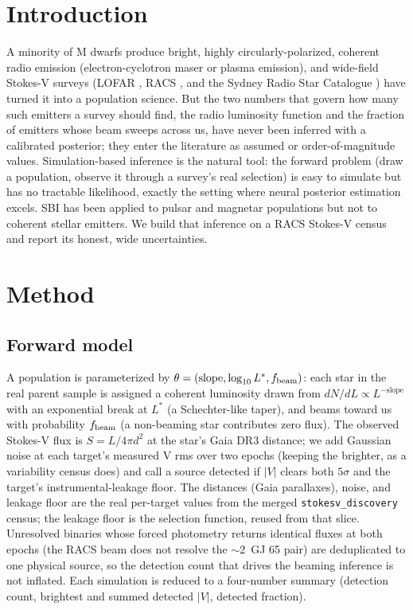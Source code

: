 \documentclass[twocolumn]{aastex631}
\newcommand{\code}[1]{\texttt{#1}}
\begin{document}

\section{Introduction}
A minority of M dwarfs produce bright, highly circularly-polarized, coherent radio emission
(electron-cyclotron maser or plasma emission), and wide-field Stokes-V surveys (LOFAR
\citep{callingham2021}, RACS \citep{pritchard2021}, and the Sydney Radio Star Catalogue
\citep{driessen2024}) have turned it into a population science. But the two numbers that
govern how many such emitters a survey should find, the radio luminosity function and the
fraction of emitters whose beam sweeps across us, have never been inferred with a calibrated
posterior; they enter the literature as assumed or order-of-magnitude values. Simulation-based
inference is the natural tool: the forward problem (draw a population, observe it through a
survey's real selection) is easy to simulate but has no tractable likelihood, exactly the
setting where neural posterior estimation \citep{papamakarios2016,sbi_toolkit} excels. SBI has
been applied to pulsar and magnetar populations \citep{graber2024,pardoaraujo2024,sautron2025}
but not to coherent stellar emitters. We build that inference on a RACS Stokes-V census and
report its honest, wide uncertainties.

\section{Method}
\label{sec:method}
\subsection{Forward model}
A population is parameterized by
$\theta = (\mathrm{slope}, \log_{10} L^*, f_{\rm beam})$: each star in the real parent sample is
assigned a coherent luminosity drawn from $dN/dL \propto L^{-\mathrm{slope}}$ with an exponential
break at $L^*$ (a Schechter-like taper), and beams toward us with probability $f_{\rm beam}$ (a
non-beaming star contributes zero flux). The observed Stokes-V flux is $S = L/4\pi d^2$ at the
star's Gaia DR3 distance; we add Gaussian noise at each target's measured V rms over two epochs
(keeping the brighter, as a variability census does) and call a source detected if $|V|$ clears
both $5\sigma$ and the target's instrumental-leakage floor. The distances (Gaia parallaxes),
noise, and leakage floor are the real per-target values from the merged \code{stokesv\_discovery}
census; the leakage floor is the selection function, reused from that slice. Unresolved binaries
whose forced photometry returns identical fluxes at both epochs (the RACS beam does not resolve
the $\sim$2\arcsec\ GJ 65 pair) are deduplicated to one physical source, so the detection count
that drives the beaming inference is not inflated. Each simulation is reduced to a four-number
summary (detection count, brightest and summed detected $|V|$, detected fraction).
\end{document}

